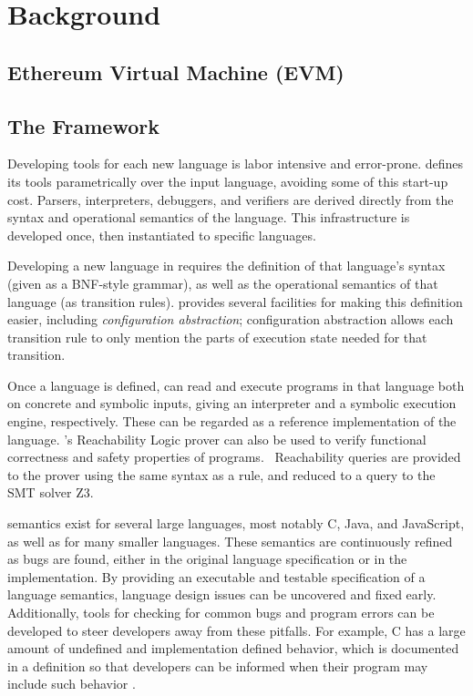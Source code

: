 \section{Background}

\subsection{Ethereum Virtual Machine (EVM)}


\subsection{The \K{} Framework}

Developing tools for each new language is labor intensive and error-prone. \K{}
defines its tools parametrically over the input language, avoiding some of this
start-up cost. Parsers, interpreters, debuggers, and verifiers are derived
directly from the syntax and operational semantics of the language. This
infrastructure is developed once, then instantiated to specific
languages.~\cite{stefanescu-park-yuwen-li-rosu-2016-oopsla}

Developing a new language in \K{} requires the definition of that language's
syntax (given as a BNF-style grammar), as well as the operational semantics of
that language (as transition rules). \K{} provides several facilities for making
this definition easier, including \textit{configuration abstraction};
configuration abstraction allows each transition rule to only mention the parts
of execution state needed for that transition.

Once a language is defined, \K{} can read and execute programs in that language
both on concrete and symbolic inputs, giving an interpreter and a symbolic
execution engine, respectively. These can be regarded as a reference
implementation of the language. \K's Reachability Logic prover can also be used
to verify functional correctness and safety properties of
programs.~\cite{stefanescu-ciobaca-mereuta-moore-serbanuta-rosu-2014-rta}
Reachability queries are provided to the prover using the same syntax as a \K{}
rule, and reduced to a query to the SMT solver Z3.~\cite{de2008z3}

\K{} semantics exist for several large languages, most notably C, Java, and
JavaScript, as well as for many smaller languages. These semantics are
continuously refined as bugs are found, either in the original language
specification or in the \K{} implementation. By providing an executable and
testable specification of a language semantics, language design issues can be
uncovered and fixed early. Additionally, tools for checking for common bugs and
program errors can be developed to steer developers away from these pitfalls.
For example, C has a large amount of undefined and implementation defined
behavior, which is documented in a \K{} definition so that developers can be
informed when their program may include such behavior
\cite{guth-hathhorn-saxena-rosu-2016-cav}.

